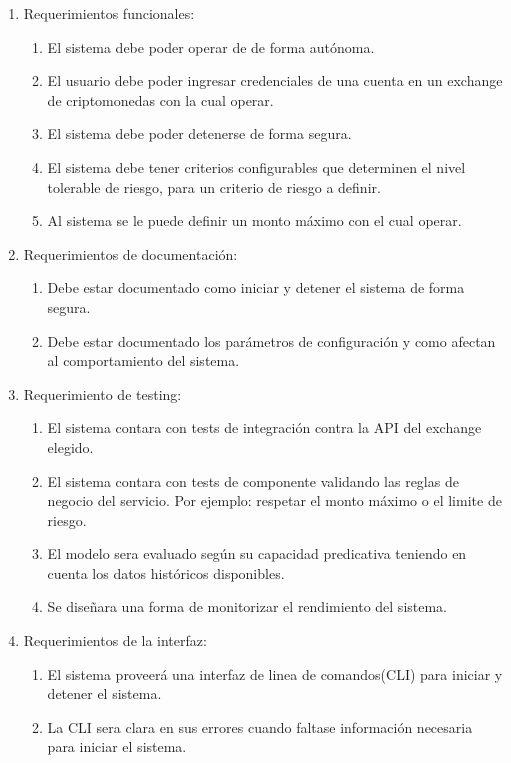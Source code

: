 \documentclass[
    11pt, %
]{charter}
\begin{document}
    \begin{enumerate}
    \item Requerimientos funcionales:
      \begin{enumerate}
      \item El sistema debe poder operar de de forma autónoma.
      \item El usuario debe poder ingresar credenciales de una cuenta en un exchange de criptomonedas con la cual operar.
      \item El sistema debe poder detenerse de forma segura.
      \item El sistema debe tener criterios configurables que determinen el nivel tolerable de riesgo, para un criterio de riesgo a definir.
      \item Al sistema se le puede definir un monto máximo con el cual operar.
      \end{enumerate}
    \item Requerimientos de documentación:
      \begin{enumerate}
      \item Debe estar documentado como iniciar y detener el sistema de forma segura.
      \item Debe estar documentado los parámetros de configuración y como afectan al comportamiento del sistema.

      \end{enumerate}
    \item Requerimiento de testing:
      \begin{enumerate}
      \item El sistema contara con tests de integración contra la API del exchange elegido.
      \item El sistema contara con tests de componente validando las reglas de negocio del servicio. Por ejemplo: respetar el monto máximo o el limite de riesgo.
      \item El modelo sera evaluado según su capacidad predicativa teniendo en cuenta los datos históricos disponibles.
      \item Se diseñara una forma de monitorizar el rendimiento del sistema.
      \end{enumerate}

    \item Requerimientos de la interfaz:
      \begin{enumerate}
      \item El sistema proveerá una interfaz de linea de comandos(CLI) para iniciar y detener el sistema.
      \item La CLI sera clara en sus errores cuando faltase información necesaria para iniciar el sistema.
      \end{enumerate}

    \end{enumerate}
\end{document}
